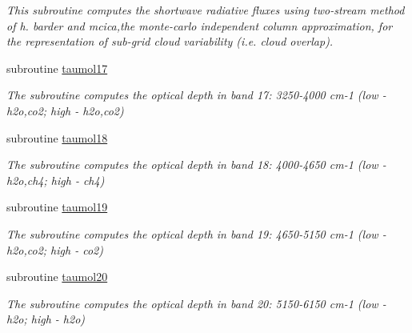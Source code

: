 \begin{DoxyCompactItemize}
\begin{DoxyCompactList}\small\item\em This subroutine computes the shortwave radiative fluxes using two-\/stream method of h. barder and mcica,the monte-\/carlo independent column approximation, for the representation of sub-\/grid cloud variability (i.\+e. cloud overlap). \end{DoxyCompactList}\item 
\mbox{\label{radsw__main_8f_ae46d1c061726bcde426caadd80b1fd80}} 
subroutine \hyperlink{radsw__main_8f_ae46d1c061726bcde426caadd80b1fd80}{taumol17}
\begin{DoxyCompactList}\small\item\em The subroutine computes the optical depth in band 17\+: 3250-\/4000 cm-\/1 (low -\/ h2o,co2; high -\/ h2o,co2) \end{DoxyCompactList}\item 
\mbox{\label{radsw__main_8f_a06f6f2b0ef60df93c267a667a2e1aa36}} 
subroutine \hyperlink{radsw__main_8f_a06f6f2b0ef60df93c267a667a2e1aa36}{taumol18}
\begin{DoxyCompactList}\small\item\em The subroutine computes the optical depth in band 18\+: 4000-\/4650 cm-\/1 (low -\/ h2o,ch4; high -\/ ch4) \end{DoxyCompactList}\item 
\mbox{\label{radsw__main_8f_a776a0d78fda9f4fd0f1153b55be597df}} 
subroutine \hyperlink{radsw__main_8f_a776a0d78fda9f4fd0f1153b55be597df}{taumol19}
\begin{DoxyCompactList}\small\item\em The subroutine computes the optical depth in band 19\+: 4650-\/5150 cm-\/1 (low -\/ h2o,co2; high -\/ co2) \end{DoxyCompactList}\item 
\mbox{\label{radsw__main_8f_a6eb9a29728a986ea6b15240adebd4a0c}} 
subroutine \hyperlink{radsw__main_8f_a6eb9a29728a986ea6b15240adebd4a0c}{taumol20}
\begin{DoxyCompactList}\small\item\em The subroutine computes the optical depth in band 20\+: 5150-\/6150 cm-\/1 (low -\/ h2o; high -\/ h2o) \end{DoxyCompactList}\item 

\end{DoxyCompactItemize}
